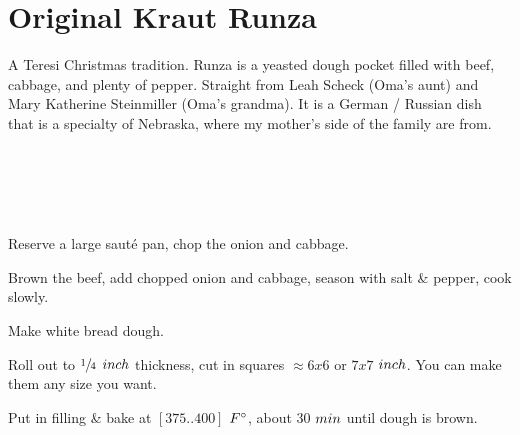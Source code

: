 \section[Kraut Runza]{Original Kraut Runza}


\begin{recipestats}[
	servings=8,
	preptime=30~\minute,
	bakingtime=4~\hour,
    original=Mrs. Sheck \& Mrs. Steinmiller,
]
\end{recipestats}


\begin{recipeabstract}
    A Teresi Christmas tradition.
    Runza is a yeasted dough pocket filled with beef, cabbage, and plenty of pepper.
    Straight from Leah Scheck (Oma's aunt) and Mary Katherine Steinmiller (Oma's grandma).
    It is a German / Russian dish that is a specialty of Nebraska, where my mother's side of the family are from.
\end{recipeabstract}


\begin{ingredientcolumns}
    \begin{ingredientblock}
		\\
        \\
	\end{ingredientblock}
	\begin{ingredientblock}
		\\
	\end{ingredientblock}
\end{ingredientcolumns}


\begin{preparation}
\item Reserve a large saut\'{e} pan, chop the onion and cabbage.
\item Brown the beef, add chopped onion and cabbage, season with salt \& pepper, cook slowly.
\item Make white bread dough.
\item Roll out to $\onefourth$ $\inch$ thickness, cut in squares $\approx6x6$ or $7x7$ $\inch$.
    You can make them any size you want.
\item Put in filling \& bake at $[375..400]$ $\Fahrenheit$, about 30 $\minute$ until dough is brown.
\end{preparation}


\recipeend%
